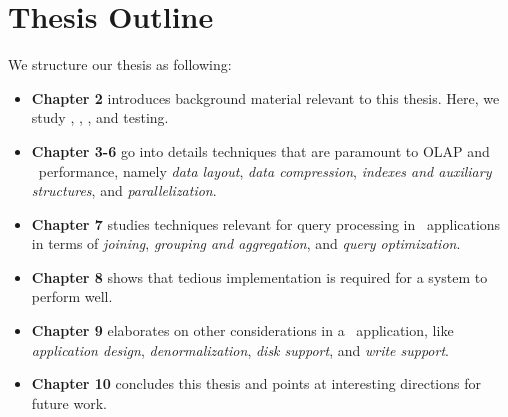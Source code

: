 \section{Thesis Outline}
\label{sec:Thesis Outline}
We structure our thesis as following:
\begin{itemize}
  \item \textbf{Chapter 2} introduces background material relevant to this thesis. Here, we study \bi, \bd, \genusSoftware, and testing.
  \item \textbf{Chapter 3-6} go into details techniques that are paramount to OLAP and \bd~performance, namely \textit{data layout}, \textit{data compression}, \textit{indexes and auxiliary structures}, and \textit{parallelization}.
  \item \textbf{Chapter 7} studies techniques relevant for query processing in \bd~applications in terms of \textit{joining}, \textit{grouping and aggregation}, and \textit{query optimization}.
  \item \textbf{Chapter 8} shows that tedious implementation is required for a system to perform well.
  \item \textbf{Chapter 9} elaborates on other considerations in a \bd~application, like \textit{application design}, \textit{denormalization}, \textit{disk support}, and \textit{write support}.
  \item \textbf{Chapter 10} concludes this thesis and points at interesting directions for future work.
\end{itemize}
